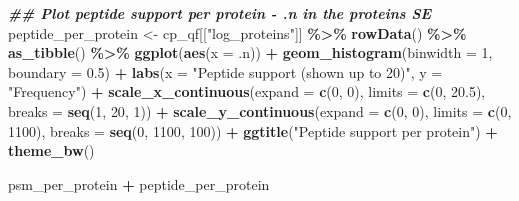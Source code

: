 \documentclass[9pt,a4paper,]{extarticle}
\newenvironment{Shaded}{\begin{snugshade}}{\end{snugshade}}
\newcommand{\AttributeTok}[1]{\textcolor[rgb]{0.13,0.29,0.53}{#1}}
\newcommand{\DecValTok}[1]{\textcolor[rgb]{0.00,0.00,0.81}{#1}}
\newcommand{\DocumentationTok}[1]{\textcolor[rgb]{0.56,0.35,0.01}{\textbf{\textit{#1}}}}
\newcommand{\FloatTok}[1]{\textcolor[rgb]{0.00,0.00,0.81}{#1}}
\newcommand{\FunctionTok}[1]{\textcolor[rgb]{0.13,0.29,0.53}{\textbf{#1}}}
\newcommand{\NormalTok}[1]{#1}
\newcommand{\OtherTok}[1]{\textcolor[rgb]{0.56,0.35,0.01}{#1}}
\newcommand{\SpecialCharTok}[1]{\textcolor[rgb]{0.81,0.36,0.00}{\textbf{#1}}}
\newcommand{\StringTok}[1]{\textcolor[rgb]{0.31,0.60,0.02}{#1}}
\begin{document}
\begin{Shaded}
\begin{Highlighting}[]
\DocumentationTok{\#\# Plot peptide support per protein {-} .n in the proteins SE}
\NormalTok{peptide\_per\_protein }\OtherTok{\textless{}{-}}\NormalTok{ cp\_qf[[}\StringTok{"log\_proteins"}\NormalTok{]] }\SpecialCharTok{\%\textgreater{}\%}
  \FunctionTok{rowData}\NormalTok{() }\SpecialCharTok{\%\textgreater{}\%}
  \FunctionTok{as\_tibble}\NormalTok{() }\SpecialCharTok{\%\textgreater{}\%}
  \FunctionTok{ggplot}\NormalTok{(}\FunctionTok{aes}\NormalTok{(}\AttributeTok{x =}\NormalTok{ .n)) }\SpecialCharTok{+}
  \FunctionTok{geom\_histogram}\NormalTok{(}\AttributeTok{binwidth =} \DecValTok{1}\NormalTok{, }\AttributeTok{boundary =} \FloatTok{0.5}\NormalTok{) }\SpecialCharTok{+}
  \FunctionTok{labs}\NormalTok{(}\AttributeTok{x =} \StringTok{"Peptide support (shown up to 20)"}\NormalTok{,}
       \AttributeTok{y =} \StringTok{"Frequency"}\NormalTok{) }\SpecialCharTok{+}
  \FunctionTok{scale\_x\_continuous}\NormalTok{(}\AttributeTok{expand =} \FunctionTok{c}\NormalTok{(}\DecValTok{0}\NormalTok{, }\DecValTok{0}\NormalTok{),}
                     \AttributeTok{limits =} \FunctionTok{c}\NormalTok{(}\DecValTok{0}\NormalTok{, }\FloatTok{20.5}\NormalTok{),}
                     \AttributeTok{breaks =} \FunctionTok{seq}\NormalTok{(}\DecValTok{1}\NormalTok{, }\DecValTok{20}\NormalTok{, }\DecValTok{1}\NormalTok{)) }\SpecialCharTok{+}
  \FunctionTok{scale\_y\_continuous}\NormalTok{(}\AttributeTok{expand =} \FunctionTok{c}\NormalTok{(}\DecValTok{0}\NormalTok{, }\DecValTok{0}\NormalTok{),}
                     \AttributeTok{limits =} \FunctionTok{c}\NormalTok{(}\DecValTok{0}\NormalTok{, }\DecValTok{1100}\NormalTok{),}
                     \AttributeTok{breaks =} \FunctionTok{seq}\NormalTok{(}\DecValTok{0}\NormalTok{, }\DecValTok{1100}\NormalTok{, }\DecValTok{100}\NormalTok{)) }\SpecialCharTok{+}
  \FunctionTok{ggtitle}\NormalTok{(}\StringTok{"Peptide support per protein"}\NormalTok{) }\SpecialCharTok{+}
  \FunctionTok{theme\_bw}\NormalTok{()}

\NormalTok{psm\_per\_protein }\SpecialCharTok{+}\NormalTok{ peptide\_per\_protein}
\end{Highlighting}
\end{Shaded}
\end{document}
